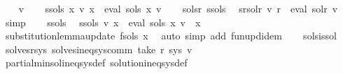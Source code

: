 \begin{isabellebody}
\ \ \isamarkupfalse%
\ v\isanewline
\ \ \isamarkupfalse%
\ s{\isacharunderscore}{\kern0pt}sols{\isacharprime}{\kern0pt}{\isacharcolon}{\kern0pt}\ {\isachardoublequoteopen}{\isasymforall}x{\isachardot}{\kern0pt}\ v\ x\ {\isacharequal}{\kern0pt}\ eval\ {\isacharparenleft}{\kern0pt}sols{\isacharprime}{\kern0pt}\ x{\isacharparenright}{\kern0pt}\ v{\isachardoublequoteclose}\isanewline
\ \ \isamarkupfalse%
\ sols{\isacharprime}{\kern0pt}{\isacharunderscore}{\kern0pt}r\ s{\isacharunderscore}{\kern0pt}sols{\isacharprime}{\kern0pt}\ \isamarkupfalse%
\ s{\isacharunderscore}{\kern0pt}r{\isacharunderscore}{\kern0pt}sol{\isacharunderscore}{\kern0pt}r{\isacharcolon}{\kern0pt}\ {\isachardoublequoteopen}v\ r\ {\isacharequal}{\kern0pt}\ eval\ sol{\isacharunderscore}{\kern0pt}r\ v{\isachardoublequoteclose}\ \isamarkupfalse%
\ simp\isanewline
\ \ \isamarkupfalse%
\ s{\isacharunderscore}{\kern0pt}sols{\isacharprime}{\kern0pt}\ \isamarkupfalse%
\ s{\isacharunderscore}{\kern0pt}sols{\isacharcolon}{\kern0pt}\ {\isachardoublequoteopen}v\ x\ {\isacharequal}{\kern0pt}\ eval\ {\isacharparenleft}{\kern0pt}sols\ x{\isacharparenright}{\kern0pt}\ v{\isachardoublequoteclose}\ \ x\isanewline
\ \ \ \ \isamarkupfalse%
\ substitution{\isacharunderscore}{\kern0pt}lemma{\isacharunderscore}{\kern0pt}update{\isacharbrackleft}{\kern0pt}\ f{\isacharequal}{\kern0pt}{\isachardoublequoteopen}sols\ x{\isachardoublequoteclose}{\isacharbrackright}{\kern0pt}\ \isamarkupfalse%
\ {\isacharparenleft}{\kern0pt}auto\ simp\ add{\isacharcolon}{\kern0pt}\ fun{\isacharunderscore}{\kern0pt}upd{\isacharunderscore}{\kern0pt}idem{\isacharparenright}{\kern0pt}\isanewline
\ \ \isamarkupfalse%
\ sols{\isacharunderscore}{\kern0pt}is{\isacharunderscore}{\kern0pt}sol\ \isamarkupfalse%
\ solves{\isacharunderscore}{\kern0pt}r{\isacharunderscore}{\kern0pt}sys{\isacharcolon}{\kern0pt}\ {\isachardoublequoteopen}solves{\isacharunderscore}{\kern0pt}ineq{\isacharunderscore}{\kern0pt}sys{\isacharunderscore}{\kern0pt}comm\ {\isacharparenleft}{\kern0pt}take\ r\ sys{\isacharparenright}{\kern0pt}\ v{\isachardoublequoteclose}\isanewline
\ \ \ \ \isamarkupfalse%
\ partial{\isacharunderscore}{\kern0pt}min{\isacharunderscore}{\kern0pt}sol{\isacharunderscore}{\kern0pt}ineq{\isacharunderscore}{\kern0pt}sys{\isacharunderscore}{\kern0pt}def\ solution{\isacharunderscore}{\kern0pt}ineq{\isacharunderscore}{\kern0pt}sys{\isacharunderscore}{\kern0pt}def\ \isamarkupfalse%

\end{isabellebody}

